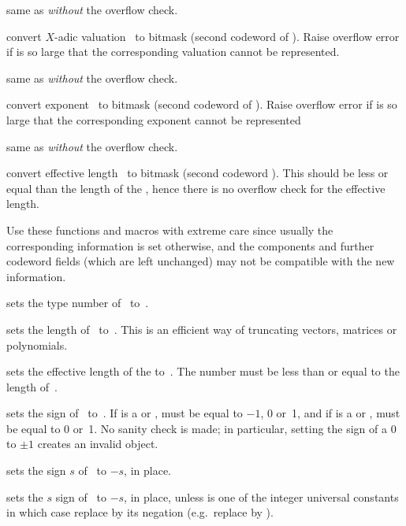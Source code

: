  same as  \emph{without} the
overflow check.

 convert $X$-adic valuation~ to
bitmask (second codeword of ). Raise overflow error if
 is so large that the corresponding valuation cannot be represented.

 same as  \emph{without} the
overflow check.

 convert exponent~ to bitmask (second
codeword of ). Raise overflow error if  is so
large that the corresponding exponent cannot be represented

 same as  \emph{without} the
overflow check.

 convert effective length~ to bitmask
(second codeword ). This should be less or equal than the length
of the , hence there is no overflow check for the effective length.

Use these functions and macros with extreme care since usually the
corresponding information is set otherwise, and the components and further
codeword fields (which are left unchanged) may not be compatible with the new
information.

 sets the type number of~ to~.

 sets the length of~ to~. This
is an efficient way of truncating vectors, matrices or polynomials.

 sets the effective length
of the   to~. The number  must be less than or
equal to the length of~.

 sets the sign of~ to~.
If  is a  or ,  must be equal to $-1$, 0
or~1, and if  is a  or ,  must be equal to 0
or~1. No sanity check is made; in particular, setting the sign of a
$0$  to $\pm1$ creates an invalid object.

 sets the sign $s$ of~ to $-s$, in place.

 sets the $s$ sign of~ to $-s$, in
place, unless  is one of the integer universal constants in which case
replace  by its negation (e.g.~replace  by ).

